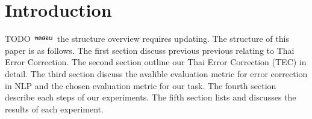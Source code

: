 \section{Introduction}

TODO \includegraphics[height=0.85em, trim=0.5em 0.45em 0.5em 0em]{thai-text/test-2.pdf} the structure overview requires updating.
The structure of this paper is as follows. The first section discuss previous previous relating to Thai Error Correction. The second section outline our Thai Error Correction (TEC) in detail. The third section discuss the avalible evaluation metric for error correction in NLP and the chosen evaluation metric for our task. The fourth section describe each steps of our experiments. The fifth section lists and discusses the results of each experiment.
